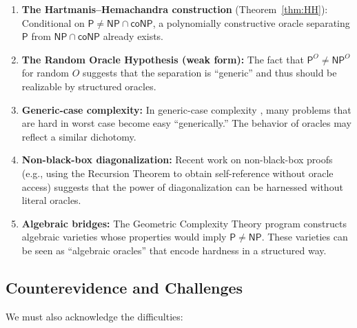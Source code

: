 \documentclass[11pt,a4paper]{article}
\theoremstyle{plain}
\theoremstyle{definition}
\theoremstyle{remark}
\newcommand{\PP}{\mathsf{P}}
\newcommand{\NP}{\mathsf{NP}}
\newcommand{\coNP}{\mathsf{coNP}}
\begin{document}
\begin{enumerate}[label=\textbf{E\arabic*}.]
    \item \textbf{The Hartmanis--Hemachandra construction} (Theorem~\ref{thm:HH}):
    Conditional on $\PP \neq \NP \cap \coNP$, a polynomially constructive oracle
    separating $\PP$ from $\NP \cap \coNP$ already exists.

    \item \textbf{The Random Oracle Hypothesis (weak form):} The fact that
    $\PP^O \neq \NP^O$ for random $O$ suggests that the separation is
    ``generic'' and thus should be realizable by structured oracles.

    \item \textbf{Generic-case complexity:} In generic-case complexity
    \cite{KM05}, many problems that are hard in worst case become easy
    ``generically.''  The behavior of oracles may reflect a similar dichotomy.

    \item \textbf{Non-black-box diagonalization:} Recent work on non-black-box
    proofs (e.g., using the Recursion Theorem to obtain self-reference without
    oracle access) suggests that the power of diagonalization can be harnessed
    without literal oracles.

    \item \textbf{Algebraic bridges:} The Geometric Complexity Theory program
    \cite{MS01} constructs algebraic varieties whose properties would imply
    $\PP \neq \NP$.  These varieties can be seen as ``algebraic oracles'' that
    encode hardness in a structured way.
\end{enumerate}

\subsection{Counterevidence and Challenges}

We must also acknowledge the difficulties:
\end{document}
